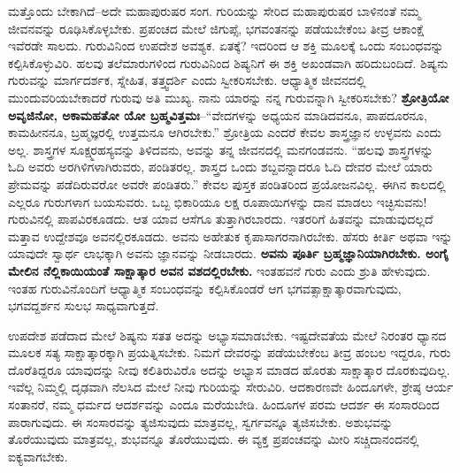 ಮತ್ತೊಂದು ಬೇಕಾಗಿದೆ–ಅದೇ ಮಹಾಪುರುಷರ ಸಂಗ. ಗುರಿಯನ್ನು ಸೇರಿದ ಮಹಾಪುರುಷರ ಬಾಳಿನಂತೆ ನಮ್ಮ ಜೀವನವನ್ನು ರೂಢಿಸಿಕೊಳ್ಳಬೇಕು. ಪ್ರಪಂಚದ ಮೇಲೆ ಜಿಗುಪ್ಸೆ, ಭಗವಂತನನ್ನು ಪಡೆಯಬೇಕೆಂಬ ತೀವ್ರ ಆಕಾಂಕ್ಷೆ ಇವೆರಡೇ ಸಾಲದು. ಗುರುವಿನಿಂದ ಉಪದೇಶ ಅವಶ್ಯಕ. ಏತಕ್ಕೆ? ಇದರಿಂದ ಆ ಶಕ್ತಿ ಮೂಲಕ್ಕೆ ಒಂದು ಸಂಬಂಧವನ್ನು ಕಲ್ಪಿಸಿಕೊಳ್ಳುವಿರಿ. ಹಲವು ತಲೆಮಾರುಗಳಿಂದ ಗುರುವಿನಿಂದ ಶಿಷ್ಯನಿಗೆ ಈ ಶಕ್ತಿ ಅಖಂಡವಾಗಿ ಹರಿದುಬಂದಿದೆ. ಶಿಷ್ಯನು ಗುರುವನ್ನು ಮಾರ್ಗದರ್ಶಕ, ಸ್ನೇಹಿತ, ತತ್ತ್ವದರ್ಶಿ ಎಂದು ಸ್ವೀಕರಿಸಬೇಕು. ಆಧ್ಯಾತ್ಮಿಕ ಜೀವನದಲ್ಲಿ ಮುಂದುವರಿಯಬೇಕಾದರೆ ಗುರುವು ಅತಿ ಮುಖ್ಯ. ನಾನು ಯಾರನ್ನು ನನ್ನ ಗುರುವನ್ನಾಗಿ ಸ್ವೀಕರಿಸಬೇಕು? \textbf{ಶ್ರೋತ್ರಿಯೋ ಅವೃಜಿನೋ, ಅಕಾಮಹತೋ ಯೋ ಬ್ರಹ್ಮವಿತ್ತಮಃ}–“ವೇದಗಳನ್ನು ಅಧ್ಯಯನ ಮಾಡಿದವನೂ, ಪಾಪದೂರನೂ, ಕಾಮಹೀನನೂ, ಬ್ರಹ್ಮಜ್ಞರಲ್ಲಿ ಉತ್ತಮನೂ ಆಗಿರಬೇಕು.” ಶ್ರೋತ್ರಿಯ ಎಂದರೆ ಕೇವಲ ಶಾಸ್ತ್ರಜ್ಞಾನ ಉಳ್ಳವನು ಎಂದು ಅಲ್ಲ. ಶಾಸ್ತ್ರಗಳ ಸೂಕ್ಷ್ಮರಹಸ್ಯವನ್ನು ತಿಳಿದವನು, ಅವನ್ನು ತನ್ನ ಜೀವನದಲ್ಲಿ ಮನಗಂಡವನು. “ಹಲವು ಶಾಸ್ತ್ರಗಳನ್ನು ಓದಿ ಅವರು ಅರಗಿಳಿಗಳಾಗಿರುವರು, ಪಂಡಿತರಲ್ಲ. ಶಾಸ್ತ್ರದ ಒಂದು ಶಬ್ದವನ್ನಾದರೂ ಓದಿ ದೇವರ ಮೇಲೆ ಯಾರು ಪ್ರೇಮವನ್ನು ಪಡೆದಿರುವರೋ ಅವರೇ ಪಂಡಿತರು.” ಕೇವಲ ಪುಸ್ತಕ ಪಂಡಿತರಿಂದ ಪ್ರಯೋಜನವಿಲ್ಲ. ಈಗಿನ ಕಾಲದಲ್ಲಿ ಎಲ್ಲರೂ ಗುರುಗಳಾಗ ಬಯಸುವರು. ಒಬ್ಬ ಭಿಕಾರಿಯೂ ಲಕ್ಷ ರೂಪಾಯಿಗಳನ್ನು ದಾನ ಮಾಡಲು ಇಚ್ಛಿಸುವನು! ಗುರುವಿನಲ್ಲಿ ಪಾಪವಿರಕೂಡದು. ಆತ ಯಾವ ಆಸೆಗೂ ತುತ್ತಾಗಿರಬಾರದು. ಇತರರಿಗೆ ಹಿತವನ್ನು ಮಾಡುವುದಲ್ಲದೆ ಮತ್ತಾವ ಉದ್ದೇಶವೂ ಅವನಲ್ಲಿರಕೂಡದು. ಅವನು ಅಹೇತುಕ ಕೃಪಾಸಾಗರನಾಗಿರಬೇಕು. ಹೆಸರು ಕೀರ್ತಿ ಅಥವಾ ಇನ್ನು ಯಾವುದೇ ಸ್ವಾರ್ಥ ಲಾಭಕ್ಕಾಗಿ ಅವನು ಜ್ಞಾನವನ್ನು ನೀಡಬಾರದು. \textbf{ಅವನು ಪೂರ್ತಿ ಬ್ರಹ್ಮಜ್ಞಾನಿಯಾಗಿರಬೇಕು. ಅಂಗೈ ಮೇಲಿನ ನೆಲ್ಲಿಕಾಯಿಯಂತೆ ಸಾಕ್ಷಾತ್ಕಾರ ಅವನ ವಶದಲ್ಲಿರಬೇಕು. } ಇಂತಹವನೆ ಗುರು ಎಂದು ಶ್ರುತಿ ಹೇಳುವುದು. ಇಂತಹ ಗುರುವಿನೊಂದಿಗೆ ಆಧ್ಯಾತ್ಮಿಕ ಸಂಬಂಧವನ್ನು ಕಲ್ಪಿಸಿಕೊಂಡರೆ ಆಗ ಭಗವತ್ಸಾಕ್ಷಾತ್ಕಾರವಾಗುವುದು, ಭಗವದ್ದರ್ಶನ ಸುಲಭ ಸಾಧ್ಯವಾಗುತ್ತದೆ. 

ಉಪದೇಶ ಪಡೆದಾದ ಮೇಲೆ ಶಿಷ್ಯನು ಸತತ ಅದನ್ನು ಅಭ್ಯಾಸಮಾಡಬೇಕು. ಇಷ್ಟದೇವತೆಯ ಮೇಲೆ ನಿರಂತರ ಧ್ಯಾನದ ಮೂಲಕ ಸತ್ಯ ಸಾಕ್ಷಾತ್ಕಾರಕ್ಕಾಗಿ ಪ್ರಯತ್ನಿಸಬೇಕು. ನಿಮಗೆ ದೇವರನ್ನು ಪಡೆಯಬೇಕೆಂಬ ತೀವ್ರ ಹಂಬಲ ಇದ್ದರೂ, ಗುರು ದೊರೆತಿದ್ದರೂ ಯಾವುದನ್ನು ನೀವು ಕಲಿತಿರುವಿರೊ ಅದನ್ನು ಅಭ್ಯಾಸ ಮಾಡದ ಹೊರತು ಸಾಕ್ಷಾತ್ಕಾರ ದೊರಕುವುದಿಲ್ಲ. ಇವೆಲ್ಲ ನಿಮ್ಮಲ್ಲಿ ದೃಢವಾಗಿ ನೆಲಸಿದ ಮೇಲೆ ನೀವು ಗುರಿಯನ್ನು ಸೇರುವಿರಿ. ಆದಕಾರಣವೇ ಹಿಂದೂಗಳೇ, ಶ್ರೇಷ್ಠ ಆರ್ಯ ಸಂತಾನರೆ, ನಮ್ಮ ಧರ್ಮದ ಆದರ್ಶವನ್ನು ಎಂದೂ ಮರೆಯಬೇಡಿ. ಹಿಂದೂಗಳ ಪರಮ ಆದರ್ಶ ಈ ಸಂಸಾರದಿಂದ ಪಾರಾಗುವುದು. ಈ ಸಂಸಾರವನ್ನು ತ್ಯಜಿಸುವುದು ಮಾತ್ರವಲ್ಲ, ಸ್ವರ್ಗವನ್ನೂ ತ್ಯಜಿಸಬೇಕು. ಅಶುಭವನ್ನು ತೊರೆಯುವುದು ಮಾತ್ರವಲ್ಲ, ಶುಭವನ್ನೂ ತೊರೆಯುವುದು. ಈ ವ್ಯಕ್ತ ಪ್ರಪಂಚವನ್ನು ಮೀರಿ ಸಚ್ಚಿದಾನಂದನಲ್ಲಿ ಐಕ್ಯವಾಗಬೇಕು. 

